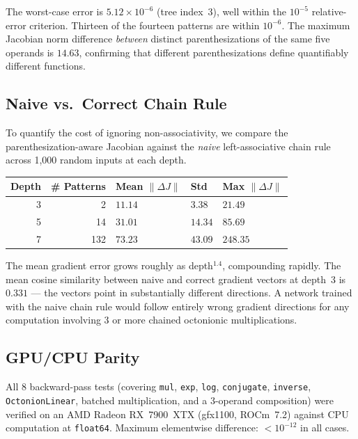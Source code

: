\documentclass[11pt]{article}
\newcommand{\norm}[1]{\lVert #1 \rVert}
\begin{document}
The worst-case error is $5.12 \times 10^{-6}$ (tree index~3), well within the
$10^{-5}$ relative-error criterion.  Thirteen of the fourteen patterns are
within $10^{-6}$.  The maximum Jacobian norm difference \emph{between} distinct
parenthesizations of the same five operands is $14.63$, confirming that different
parenthesizations define quantifiably different functions.

\subsection{Naive vs.\ Correct Chain Rule}

To quantify the cost of ignoring non-associativity, we compare the parenthesization-aware
Jacobian against the \emph{naive} left-associative chain rule across 1{,}000
random inputs at each depth.

\begin{center}
\begin{tabular}{rrlll}
  \toprule
  Depth & \# Patterns & Mean $\norm{\Delta J}$ & Std & Max $\norm{\Delta J}$ \\
  \midrule
  3 & 2   & $11.14$ & $3.38$ & $21.49$ \\
  5 & 14  & $31.01$ & $14.34$ & $85.69$ \\
  7 & 132 & $73.23$ & $43.09$ & $248.35$ \\
  \bottomrule
\end{tabular}
\end{center}

The mean gradient error grows roughly as depth$^{1.4}$, compounding rapidly.
The mean cosine similarity between naive and correct gradient vectors at depth~3
is $0.331$ — the vectors point in substantially different directions.  A network
trained with the naive chain rule would follow entirely wrong gradient directions
for any computation involving 3 or more chained octonionic multiplications.

\subsection{GPU/CPU Parity}

All 8 backward-pass tests (covering \texttt{mul}, \texttt{exp}, \texttt{log},
\texttt{conjugate}, \texttt{inverse}, \texttt{OctonionLinear}, batched
multiplication, and a 3-operand composition) were verified on an AMD Radeon
RX~7900~XTX (gfx1100, ROCm~7.2) against CPU computation at \texttt{float64}.
Maximum elementwise difference: $< 10^{-12}$ in all cases.
\end{document}
